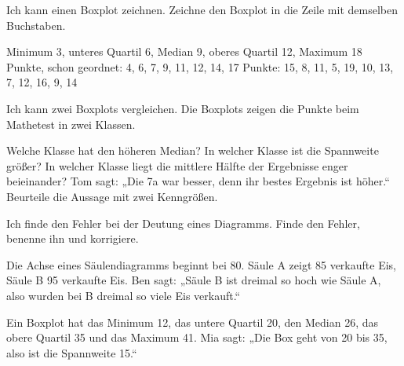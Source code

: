 \begin{aufgabe}{Ich kann einen Boxplot zeichnen.}
Zeichne den Boxplot in die Zeile mit demselben Buchstaben.
\begin{teile}
\teil Minimum 3, unteres Quartil 6, Median 9, oberes Quartil 12, Maximum 18
\teil Punkte, schon geordnet: 4, 6, 7, 9, 11, 12, 14, 17
\teil Punkte: 15, 8, 11, 5, 19, 10, 13, 7, 12, 16, 9, 14
\end{teile}

\begin{boxplots}[xmin=0,xmax=20,xstep=1,xlabel=Punkte]
\end{boxplots}
\end{aufgabe}

\begin{aufgabe}{Ich kann zwei Boxplots vergleichen.}
Die Boxplots zeigen die Punkte beim Mathetest in zwei Klassen.

\begin{boxplots}[xmin=0,xmax=20,xstep=1,xlabel=Punkte]
\end{boxplots}

\begin{teile}
\teil Welche Klasse hat den höheren Median? \hfill \leerfeld
\teil In welcher Klasse ist die Spannweite größer? \hfill \leerfeld
\teil In welcher Klasse liegt die mittlere Hälfte der Ergebnisse enger beieinander? \hfill \leerfeld
\teil Tom sagt: „Die 7a war besser, denn ihr bestes Ergebnis ist höher.“ Beurteile die Aussage mit zwei Kenngrößen.
\end{teile}
\end{aufgabe}

\begin{aufgabe}{Ich finde den Fehler bei der Deutung eines Diagramms.}
Finde den Fehler, benenne ihn und korrigiere.
\begin{teile}
\teil Die Achse eines Säulendiagramms beginnt bei 80. Säule A zeigt 85 verkaufte Eis, Säule B 95 verkaufte Eis. Ben sagt: „Säule B ist dreimal so hoch wie Säule A, also wurden bei B dreimal so viele Eis verkauft.“
\par\vspace{16mm}
\teil Ein Boxplot hat das Minimum 12, das untere Quartil 20, den Median 26, das obere Quartil 35 und das Maximum 41. Mia sagt: „Die Box geht von 20 bis 35, also ist die Spannweite 15.“
\par\vspace{16mm}
\end{teile}
\end{aufgabe}


